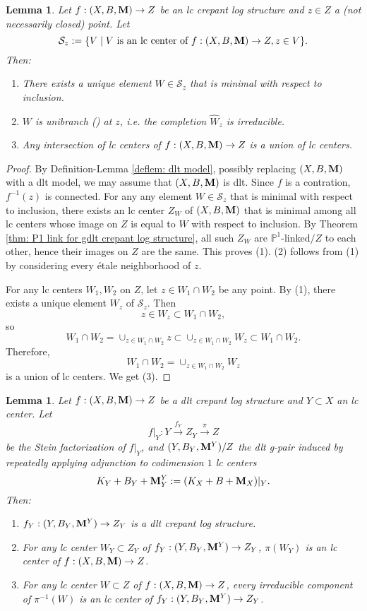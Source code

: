 \documentclass[11pt]{amsart}
\numberwithin{equation}{section}
\newcommand{\Mm}{{\bf{M}}}
\newtheorem{lem}[thm]{Lemma}
\theoremstyle{definition}
\theoremstyle{definition}
\theoremstyle{definition}
\begin{document}
\begin{lem}\label{lem: intersection of lc center gpair}
Let $f: (X,B,\Mm)\rightarrow Z$ be an lc crepant log structure and $z\in Z$ a (not necessarily closed) point. Let $$\mathcal{S}_z:=\{V\mid V\text{ is an lc center of }f: (X,B,\Mm)\rightarrow Z, z\in V\}.$$
Then:
\begin{enumerate}
    \item There exists a unique element $W\in\mathcal{S}_z$ that is minimal with respect to inclusion. 
    \item $W$ is unibranch (\cite[Definition 1.44]{Kol13}) at $z$, i.e.  the completion $\widehat{W}_z$ is irreducible.
    \item Any intersection of lc centers of $f: (X,B,\Mm)\rightarrow Z$  is a union of lc centers.
\end{enumerate}
\end{lem}
\begin{proof}
By Definition-Lemma \ref{deflem: dlt model}, possibly replacing $(X,B,\Mm)$ with a dlt model, we may assume that $(X,B,\Mm)$ is dlt. Since $f$ is a contration, $f^{-1}(z)$ is connected. For any any element $W\in\mathcal{S}_z$ that is minimal with respect to inclusion, there exists an lc center $Z_W$ of $(X,B,\Mm)$ that is minimal among all lc centers whose image on $Z$ is equal to $W$ with respect to inclusion. By Theorem \ref{thm: P1 link for gdlt crepant log structure}, all such $Z_W$ are $\mathbb P^1$-linked$/Z$ to each other, hence their images on $Z$ are the same. This proves (1). (2) follows from (1) by considering every \'etale neighborhood of $z$. 

For any lc centers $W_1,W_2$ on $Z$, let $z\in W_1\cap W_2$ be any point. By (1), there exists a unique element $W_z$ of $\mathcal{S}_z$. Then
$$z\in W_z\subset W_1\cap W_2,$$
so 
$$W_1\cap W_2=\cup_{z\in W_1\cap W_2}z\subset \cup_{z\in W_1\cap W_2}W_z\subset W_1\cap W_2.$$
Therefore, 
$$W_1\cap W_2=\cup_{z\in W_1\cap W_2}W_z$$
is a union of lc centers. We get (3).
\end{proof}

\begin{lem}\label{lem: gdlt crepant log structure is compatible under subadjunction}
Let $f: (X,B,\Mm)\to Z$ be a dlt crepant log structure and $Y\subset X$ an lc center. Let
$$
f|_Y: Y\xrightarrow{f_Y}Z_Y\xrightarrow{\pi} Z
$$
be the Stein factorization of $f|_Y$, and $(Y,B_Y,\Mm^Y)/Z$ the dlt g-pair induced \emph{by repeatedly applying adjunction to codimension $1$ lc centers}
$$K_Y+B_Y+\Mm_Y^Y:=(K_X+B+\Mm_X)|_Y.$$
Then:
\begin{enumerate}
\item $f_Y: (Y,B_Y,\Mm^Y)\rightarrow Z_Y$ is a dlt crepant log structure.
\item For any lc center $W_Y\subset Z_Y$ of $f_Y: (Y,B_Y,\Mm^Y)\rightarrow Z_Y$, $\pi(W_Y)$ is an lc center of $f: (X,B,\Mm)\rightarrow Z$.
\item For any lc center $W\subset Z$ of $f: (X,B,\Mm)\rightarrow Z$, every irreducible component of $\pi^{-1}(W)$ is an lc center of  $f_Y: (Y,B_Y,\Mm^Y)\rightarrow Z_Y$.
\end{enumerate}
\end{lem}
\end{document}
